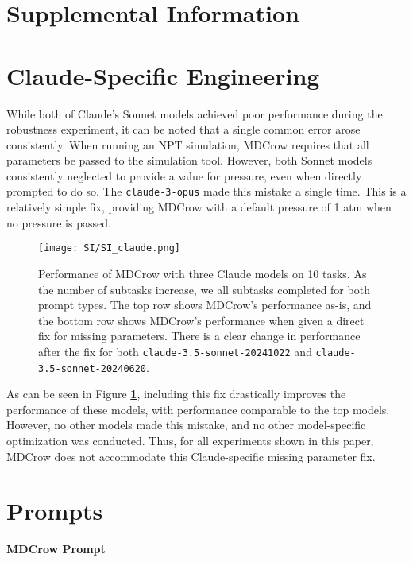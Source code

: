 \section*{Supplemental Information}\label{supmat}

\section{Claude-Specific Engineering} \label{Claude-SI}
While both of Claude's Sonnet models achieved poor performance during the robustness experiment, it can be noted that a single common error arose consistently. When running an NPT simulation, MDCrow requires that all parameters be passed to the simulation tool. However, both Sonnet models consistently neglected to provide a value for pressure, even when directly prompted to do so. The \texttt{claude-3-opus} made this mistake a single time. This is a relatively simple fix, providing MDCrow with a default pressure of 1 atm when no pressure is passed. 

\begin{figure}[h!]
    \centering
    \texttt{[image: SI/SI\_claude.png]}
    \caption{Performance of MDCrow with three Claude models on 10 tasks. As the number of subtasks increase, we all subtasks completed for both prompt types. The top row shows MDCrow's performance as-is, and the bottom row shows MDCrow's performance when given a direct fix for missing parameters. There is a clear change in performance after the fix for both \texttt{claude-3.5-sonnet-20241022} and \texttt{claude-3.5-sonnet-20240620}.}
    \label{fig:SI_claude}
\end{figure}

As can be seen in Figure \textbf{\ref{fig:SI_claude}}, including this fix drastically improves the performance of these models, with performance comparable to the top models. However, no other models made this mistake, and no other model-specific optimization was conducted. Thus, for all experiments shown in this paper, MDCrow does not accommodate this Claude-specific missing parameter fix. 

\begin{minipage}{\linewidth}
\section{Prompts}\label{prompts-SI}
\textbf{MDCrow Prompt}

\end{minipage}

